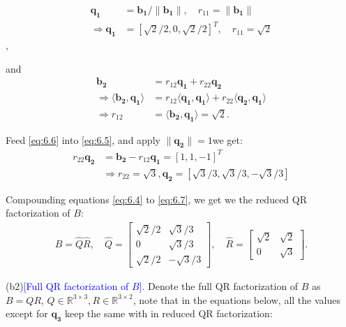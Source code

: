 \begin{align}
    \mathbf{q_1} &= \mathbf{b_1}/\|\mathbf{b_1}\|, \quad r_{11} = \|\mathbf{b_1}\|
    \nonumber \\
    \Rightarrow
    \label{eq:6.4} 
    \mathbf{q_1} &= [\sqrt{2}/2, 0, \sqrt{2}/2]^T, \quad r_{11} = \sqrt{2} 
\end{align},

and 
\begin{align}
    \label{eq:6.5}
    \mathbf{b_2} &= r_{12}\mathbf{q_1} + r_{22}\mathbf{q_2}
    \\
    \Rightarrow
    \langle\mathbf{b_2}, \mathbf{q_1} \rangle 
    &=  
    r_{12} \langle\mathbf{q_1}, \mathbf{q_1} \rangle 
    + r_{22}\langle\mathbf{q_2}, \mathbf{q_1} \rangle 
    \nonumber \\
    \label{eq:6.6}
    \Rightarrow r_{12} &= \langle\mathbf{b_2}, \mathbf{q_1} \rangle =  \sqrt{2}.
\end{align}

Feed \eqref{eq:6.6} into \eqref{eq:6.5}, and apply $\|\mathbf{q_2}\| = 1$we get:
\begin{align}
    r_{22}\mathbf{q_2} &= \mathbf{b_2} - r_{12}\mathbf{q_1} = [1, 1, -1]^T
    \nonumber \\
    \label{eq:6.7}
    &\Rightarrow r_{22} = \sqrt{3}, \mathbf{q_2} = [\sqrt{3}/3, \sqrt{3}/3, -\sqrt{3}/3]
\end{align}

Compounding equations \eqref{eq:6.4} to \eqref{eq:6.7}, 
we get we the reduced QR factorization of $B$:
\begin{align*}
    B = \hat{Q}\hat{R}, \quad
    \hat{Q} = \begin{bmatrix}
        \sqrt{2}/2 & \sqrt{3}/3\\ 0 & \sqrt{3}/3\\ \sqrt{2}/2 & -\sqrt{3}/3
    \end{bmatrix},\quad
    \hat{R} = \begin{bmatrix}
        \sqrt{2} & \sqrt{2} \\ 0  & \sqrt{3}
        \end{bmatrix}.
    \end{align*}





(b2)\textcolor{blue}{[Full QR factorization of $B$]}. 
Denote the full QR factorization of $B$ as
$B = QR$, $
    Q \in \mathbb{R}^{3 \times 3},
    R \in \mathbb{R}^{3 \times 2} 
    $,
note that in the equations below, 
all the values except for $\mathbf{q_3}$
keep the same with in reduced QR factorization:

